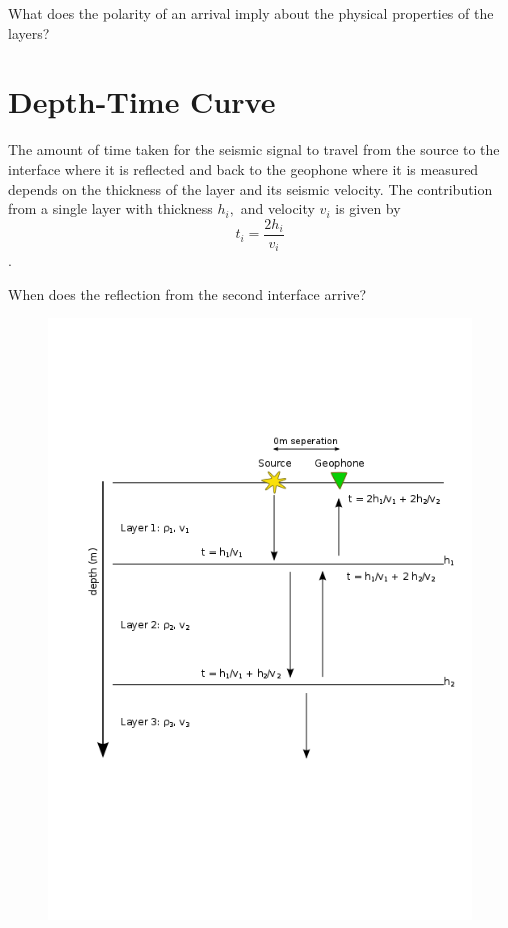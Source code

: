\documentclass{article}[11pt,oneside]
\begin{document}
What does the polarity of an arrival imply about the physical properties of the layers?



\section*{Depth-Time Curve}
The amount of time taken for the seismic signal to travel from the source to the interface where it is reflected and back to the geophone where it is measured depends on the thickness of the layer and its seismic velocity. The contribution from a single layer with thickness $h_i,$ and velocity $v_i$ is given by
$$t_i = \frac{2h_i}{v_i}$$.

When does the reflection from the second interface arrive?


\begin{figure}[H]
	\centering \includegraphics[width=\textwidth]{TimeTravel.png}
\end{figure}
\end{document}
